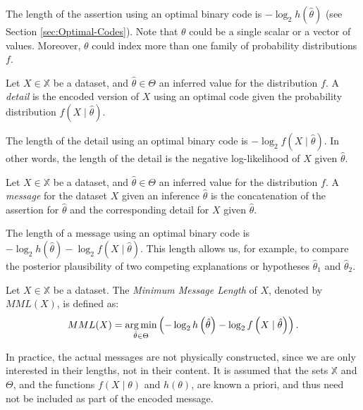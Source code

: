 The length of the assertion using an optimal binary code is $- \log_2 h(\hat\theta)$ (see Section \ref{sec:Optimal-Codes}). Note that $\theta$ could be a single scalar or a vector of values. Moreover, $\theta$ could index more than one family of probability distributions $f$.

\begin{definition}
Let $X \in \mathbb{X}$ be a dataset, and $\hat \theta \in \Theta$ an inferred value for the distribution $f$. A \emph{detail} is the encoded version of $X$ using an optimal code given the probability distribution $f(X \mid \hat\theta)$.
\end{definition}

The length of the detail using an optimal binary code is $- \log_2 f( X \mid \hat\theta )$. In other words, the length of the detail is the negative log-likelihood of $X$ given $\hat\theta$.

\begin{definition}
Let $X \in \mathbb{X}$ be a dataset, and $\hat \theta \in \Theta$ an inferred value for the distribution $f$. A \emph{message} for the dataset $X$ given an inference $\hat\theta$ is the concatenation of the assertion for $\hat\theta$ and the corresponding detail for $X$ given $\hat\theta$.
\end{definition}

The length of a message using an optimal binary code is $- \log_2 h \left( \hat\theta \right) - \log_2 f \left( X \mid \hat\theta \right)$. This length allows us, for example, to compare the posterior plausibility of two competing explanations or hypotheses $\hat\theta_1$ and $\hat\theta_2$.

\begin{definition}
Let $X \in \mathbb{X}$ be a dataset. The \emph{Minimum Message Length} of $X$, denoted by $MML(X)$, is defined as:
\[
MML(X) = \operatorname*{arg\,min}_{\hat\theta \in \Theta} \left( - \log_2 h \left( \hat\theta \right) - \log_2 f \left( X \mid \hat\theta \right) \right).
\]
\end{definition}

In practice, the actual messages are not physically constructed, since we are only interested in their lengths, not in their content. It is assumed that the sets $\mathbb{X}$ and $\Theta$, and the functions $f(X \mid \theta)$ and $h(\theta)$, are known a priori, and thus need not be included as part of the encoded message.

